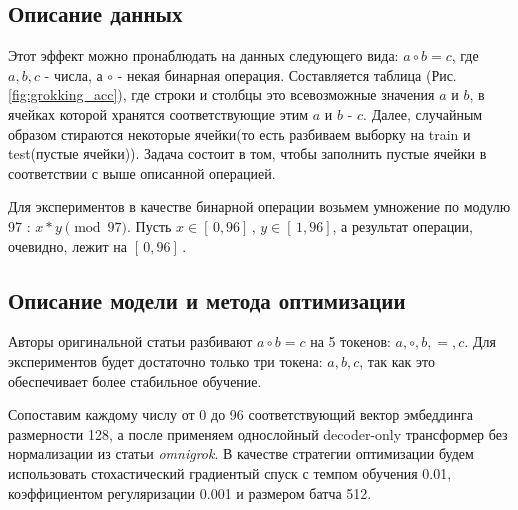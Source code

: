 \documentclass{article} %
\begin{document}
\subsection{Описание данных}
Этот эффект можно пронаблюдать на данных следующего вида: $a\circ b=c$, где $a, b, c$ - числа, а $\circ$ - некая бинарная операция. Составляется таблица (Рис. \ref{fig:grokking_acc}), где строки и столбцы это всевозможные значения $a$ и $b$, в ячейках которой хранятся соответствующие этим $a$ и $b$ - $c$. Далее, случайным образом стираются некоторые ячейки(то есть разбиваем выборку на train и test(пустые ячейки)). Задача состоит в том, чтобы заполнить пустые ячейки в соответствии с выше описанной операцией.

Для экспериментов в качестве бинарной операции возьмем умножение по модулю 97 : $x * y \pmod{97}$. Пусть $x \in [ \, 0, 96 ] \,$, $y \in [ \, 1, 96 ]$, а результат операции, очевидно, лежит на $[ \, 0, 96 ] \,$. 
\subsection{Описание модели и метода оптимизации}
Авторы оригинальной статьи разбивают $a\circ b=c$ на 5 токенов: $a, \circ, b, =, c$. Для экспериментов будет достаточно только три токена: $a, b, c$, так как это обеспечивает более стабильное обучение. 

Сопоставим каждому числу от 0 до 96 соответствующий вектор эмбеддинга размерности 128, а после применяем однослойный decoder-only трансформер без нормализации из статьи \textit{omnigrok}\cite{liu2023omnigrok}. В качестве стратегии оптимизации будем использовать стохастический градиентый спуск с темпом обучения 0.01, коэффициентом регуляризации 0.001 и размером батча 512.
\end{document}
